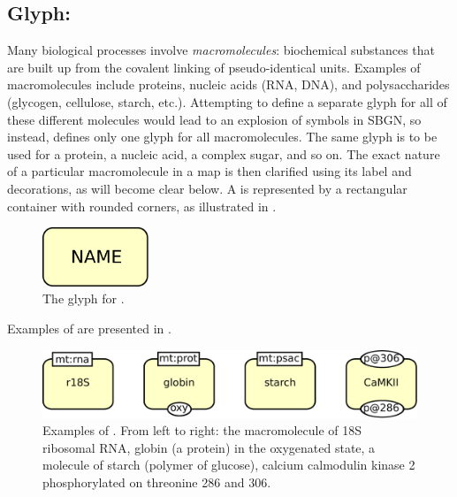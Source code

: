 
\subsection{Glyph: }
\label{sec:macromolecule}

Many biological processes involve \emph{macromolecules}: biochemical substances that are built up from the covalent linking of pseudo-identical units.  Examples of macromolecules include proteins, nucleic acids (RNA, DNA), and polysaccharides (glycogen, cellulose, starch, etc.).  Attempting to define a separate glyph for all of these different molecules would lead to an explosion of symbols in SBGN, so instead, \SBGNPDLone defines only one glyph for all macromolecules.  The same glyph is to be used for a protein, a nucleic acid, a complex sugar, and so on.  The exact nature of a particular macromolecule in a map is then clarified using its label and decorations, as will become clear below.  A  is represented by a rectangular container with rounded corners, as illustrated in . 

\begin{figure}[H]
  \centering
  \includegraphics[width = 1.25in]{images/macromolecule-plain}
  \caption{The \PD glyph for .}
  \label{fig:macromolecule}
\end{figure}

Examples of  are presented in .

\begin{figure}[H]
  \centering
  \includegraphics[scale = 0.5]{images/macromolecule-examples}
  \caption{Examples of . From left to right: the macromolecule of 18S ribosomal RNA, globin (a protein) in the oxygenated state, a molecule of starch (polymer of glucose), calcium calmodulin kinase 2 phosphorylated on threonine 286 and 306.}
  \label{fig:macromolecule-examples}
\end{figure}




